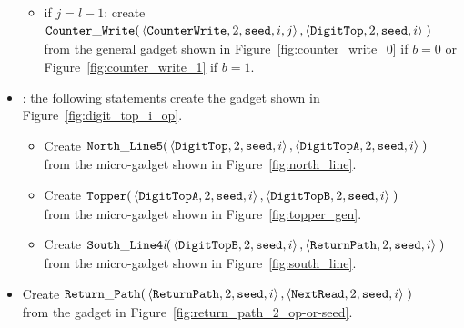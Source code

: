 \begin{itemize}
\begin{itemize}
        \item if $j = l-1$: create
        $\begin{aligned}[t]
            {\tt Counter\_Write}(&\left\langle {\tt CounterWrite}, 2, {\tt seed}, i, j \right\rangle, \left\langle {\tt DigitTop}, 2, {\tt seed}, i \right\rangle \;)
        \end{aligned}$\\from the general gadget shown in Figure~\ref{fig:counter_write_0} if $b = 0$ or Figure~\ref{fig:counter_write_1} if $b = 1$.
    \end{itemize}


    \item {\dtop}: the following statements create the gadget shown in Figure~\ref{fig:digit_top_i_op}.
    \begin{itemize}
        \item Create
        $\begin{aligned}[t]
            {\tt North\_Line5}(& \left \langle {\tt DigitTop},  2, {\tt seed} , i \right\rangle,
                                 \left \langle {\tt DigitTopA}, 2, {\tt seed} , i \right\rangle \;)
        \end{aligned}$\\ from the micro-gadget shown in Figure~\ref{fig:north_line}.

        \item Create
        $\begin{aligned}[t]
            {\tt Topper}(& \left \langle {\tt DigitTopA}, 2, {\tt seed}, i \right\rangle,
                           \left \langle {\tt DigitTopB}, 2, {\tt seed}, i \right\rangle \;)
        \end{aligned}$\\ from the micro-gadget shown in Figure~\ref{fig:topper_gen}.

        \item Create
        $\begin{aligned}[t]
            {\tt South\_Line4\textit{l}}(&\left\langle {\tt DigitTopB},  2, {\tt seed}, i \right\rangle,
                                          \left\langle {\tt ReturnPath}, 2, {\tt seed}, i \right\rangle \;)
        \end{aligned}$\\ from the micro-gadget shown in Figure~\ref{fig:south_line}.
    \end{itemize}


    \item Create
    $\begin{aligned}[t]
        {\tt Return\_Path}(&\left\langle {\tt ReturnPath}, 2, {\tt seed}, i \right\rangle,
                     \left\langle {\tt NextRead},   2, {\tt seed}, i \right\rangle \;)
    \end{aligned}$\\ from the gadget in Figure~\ref{fig:return_path_2_op-or-seed}.


\end{itemize}
